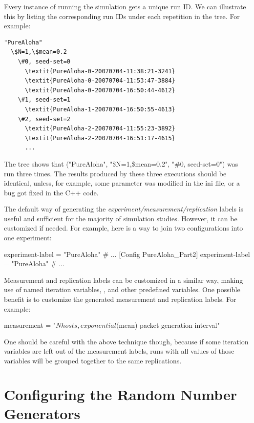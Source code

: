Every instance of running the simulation gets a unique run ID. We can
illustrate this by listing the corresponding run IDs under each
repetition in the tree. For example:

\begin{Verbatim}[commandchars=\\\{\}]
"PureAloha"
  \$N=1,\$mean=0.2
    \#0, seed-set=0
      \textit{PureAloha-0-20070704-11:38:21-3241}
      \textit{PureAloha-0-20070704-11:53:47-3884}
      \textit{PureAloha-0-20070704-16:50:44-4612}
    \#1, seed-set=1
      \textit{PureAloha-1-20070704-16:50:55-4613}
    \#2, seed-set=2
      \textit{PureAloha-2-20070704-11:55:23-3892}
      \textit{PureAloha-2-20070704-16:51:17-4615}
      ...
\end{Verbatim}

The tree shows that ("PureAloha", "\$N=1,\$mean=0.2", "\#0, seed-set=0")
was run three times. The results produced
by these three executions should be identical, unless, for example,
some parameter was modified in the ini file, or a bug got fixed in the
C++ code.

The default way of generating the \textit{experiment/measurement/replication}
labels is useful and sufficient for the majority of simulation studies.
However, it can be customized if needed. For example, here is a way to join two
configurations into one experiment:

\begin{inifile}
experiment-label = "PureAloha"
# ...
[Config PureAloha_Part2]
experiment-label = "PureAloha"
# ...
\end{inifile}

Measurement and replication labels can be customized in a similar way,
making use of named iteration variables, ,
 and other predefined variables. One possible benefit is
to customize the generated measurement and replication labels. For
example:

\begin{inifile}
measurement = "${N} hosts, exponential(${mean}) packet generation interval"
\end{inifile}

One should be careful with the above technique though, because if some
iteration variables are left out of the measurement labels, runs with
all values of those variables will be grouped together to the same
replications.


\section{Configuring the Random Number Generators}
\label{sec:config-sim:rng-config}

